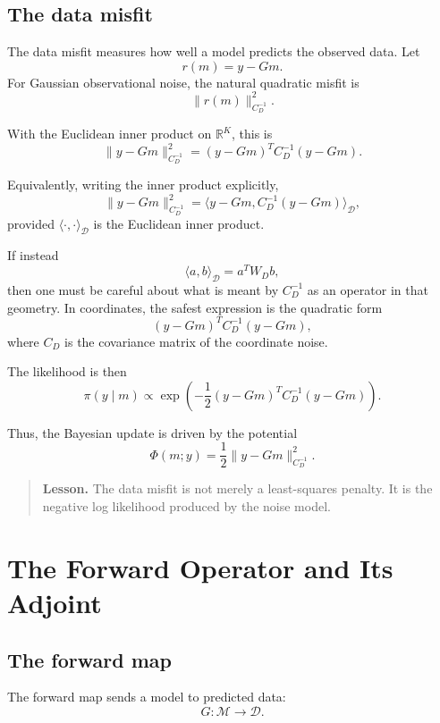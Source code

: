 \documentclass[11pt,a4paper]{book}
\newenvironment{lesson}
  {\begin{quote}\textbf{Lesson.}}
  {\end{quote}}
\newcommand{\M}{\mathcal{M}}      %
\newcommand{\D}{\mathcal{D}}      %
\newcommand{\R}{\mathbb{R}}
\newcommand{\obs}{y}
\newcommand{\G}{G}
\begin{document}
\section{The data misfit}

The data misfit measures how well a model predicts the observed data. Let
\[
    r(m)
    =
    \obs-\G m.
\]
For Gaussian observational noise, the natural quadratic misfit is
\[
    \|r(m)\|_{C_D^{-1}}^2.
\]

With the Euclidean inner product on $\R^K$, this is
\[
    \|\obs - \G m\|_{C_D^{-1}}^2
    =
    (\obs-\G m)^T C_D^{-1}(\obs-\G m).
\]

Equivalently, writing the inner product explicitly,
\[
    \|\obs - \G m\|_{C_D^{-1}}^2
    =
    \langle \obs - \G m,
    C_D^{-1}(\obs - \G m)
    \rangle_{\D},
\]
provided $\langle\cdot,\cdot\rangle_{\D}$ is the Euclidean inner product.

If instead
\[
    \langle a,b\rangle_{\D}=a^T W_D b,
\]
then one must be careful about what is meant by $C_D^{-1}$ as an operator in
that geometry. In coordinates, the safest expression is the quadratic form
\[
    (\obs-\G m)^T C_D^{-1}(\obs-\G m),
\]
where $C_D$ is the covariance matrix of the coordinate noise.

The likelihood is then
\[
    \pi(\obs\mid m)
    \propto
    \exp
    \left(
        -
        \frac{1}{2}
        (\obs-\G m)^T C_D^{-1}(\obs-\G m)
    \right).
\]

Thus, the Bayesian update is driven by the potential
\[
    \Phi(m;\obs)
    =
    \frac{1}{2}
    \|\obs-\G m\|_{C_D^{-1}}^2.
\]

\begin{lesson}
The data misfit is not merely a least-squares penalty. It is the negative log
likelihood produced by the noise model.
\end{lesson}


\chapter{The Forward Operator and Its Adjoint}

\section{The forward map}

The forward map sends a model to predicted data:
\[
    \G : \M \to \D.
\]
\end{document}
